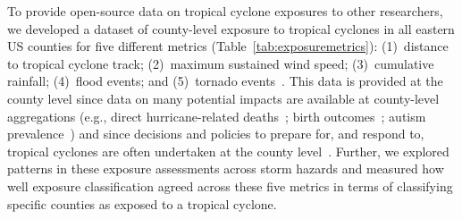 To provide open-source data on tropical cyclone exposures to other researchers,
we developed a dataset of county-level exposure to tropical cyclones in all
eastern \ac{US} counties for five different metrics
(Table~\ref{tab:exposuremetrics}): (1)~distance to tropical cyclone track;
(2)~maximum sustained wind speed; (3)~cumulative rainfall; (4)~flood events;
and (5)~tornado events~\parencite{hurricaneexposure}. This data is provided at
the county level since data on many potential impacts are available at
county-level aggregations (e.g., direct hurricane-related
deaths~\parencite{czajkowski2011}; birth outcomes~\parencite{grabich2015,
grabich2016}; autism prevalence~\parencite{kinney2008}) and since decisions and
policies to prepare for, and respond to, tropical cyclones are often undertaken
at the county level~\parencite{zandbergen2009, rappaport2000}. Further, we
explored patterns in these exposure assessments across storm hazards and
measured how well exposure classification agreed across these five metrics in
terms of classifying specific counties as exposed to a tropical cyclone.  
